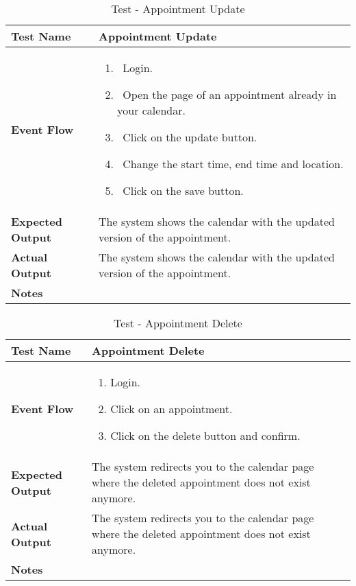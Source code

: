 \begin{table}[h]	
\centering
\def\arraystretch{1.5}
\begin{tabular}{|m{7cm}|m{7cm}|}
	\hline
	\textbf{Test Name}            &  Appointment Update  \\ \hline
	\textbf{Event Flow}             & 
		\begin{enumerate}
			\item~Login.
			\item~Open the page of an appointment already in your calendar.
			\item~Click on the update button.
			\item~Change the start time, end time and location.
			\item~Click on the save button.
		\end{enumerate}
	\\ \hline
	\textbf{Expected Output}  &  The system shows the calendar with the updated version of the appointment.   \\ \hline
	\textbf{Actual Output}       &  The system shows the calendar with the updated version of the appointment.   \\ \hline
	\textbf{Notes} & \\ \hline
\end{tabular}
\caption{Test - Appointment Update}
\end{table}


\begin{table}[h]	
	\centering
	\def\arraystretch{1.5}
	\begin{tabular}{|m{7cm}|m{7cm}|}
		\hline
		\textbf{Test Name}            & Appointment Delete   \\ \hline
		\textbf{Event Flow}             & 
		\begin{enumerate}
			\item Login.
			\item Click on an appointment.
			\item Click on the delete button and confirm.
		\end{enumerate} \\ \hline
		\textbf{Expected Output}  &  The system redirects you to the calendar page where the deleted appointment does not exist anymore.  \\ \hline
		\textbf{Actual Output}       & The system redirects you to the calendar page where the deleted appointment does not exist anymore.    \\ \hline
		\textbf{Notes} & \\ \hline
	\end{tabular}
	\caption{Test - Appointment Delete}
\end{table}


